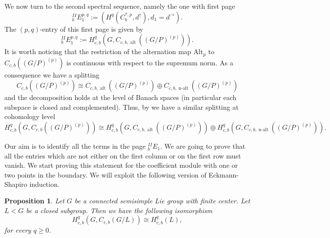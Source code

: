 \documentclass[a4paper]{amsart}
\newtheorem{prop}[lem]{Proposition}
\theoremstyle{definition}
\theoremstyle{remark}
\theoremstyle{TheoremNum}
\DeclareMathOperator{\alt}{\mathrm{alt}}
\DeclareMathOperator{\nalt}{\mathrm{n-alt}}
\begin{document}
We now turn to the second spectral sequence, namely the one with first page
$$
^{II}_bE_1^{p,q}:=(H^q(C_b^{\ast,p},d^\uparrow),d_1=d^\rightarrow). 
$$
The $(p,q)$-entry of this first page is given by
\begin{equation}\label{pq entry bounded}
^{II}_bE_1^{p,q}:=H_{c,b}^q(G,C_{c,b,\alt}((G/P)^{(p)})).
\end{equation}
It is worth noticing that the restriction of the alternation map $\mathrm{Alt}_p$ to $C_{c,b}((G/P)^{(p)})$ is continuous with respect to the supremum norm. As a consequence we have a splitting
\begin{equation}\label{splitting bounded}
C_{c,b}((G/P)^{(p)}) \cong C_{c,b,\alt}((G/P)^{(p)}) \oplus C_{c,b,\nalt}((G/P)^{(p)})
\end{equation}
and the decomposition holds at the level of Banach spaces (in particular each subspace is closed and complemented). Thus, by \cite[Corollary 8.2.10]{Monodbook} we have a similar splitting at cohomology level
\begin{equation}\label{splitting bounded cohomology}
H^q_{c,b}(G,C_{c,b}((G/P)^{(p)})) \cong H^q_{c,b}(G,C_{c,b,\alt}((G/P)^{(p)})) \oplus H^q_{c,b}(G,C_{c,b,\nalt}((G/P)^{(p)})). 
\end{equation}

Our aim is to identify all the terms in the page $^{II}_bE_1$. We are going to prove that all the entries which are not either on the first column or on the first row must vanish. We start proving this statement for the coefficient module with one or two points in the boundary. We will exploit the following version of Eckmann-Shapiro induction.

\begin{prop}\label{continuous induction iso}
Let $G$ be a connected semisimple Lie group with finite center. Let $L < G$ be a closed subgroup. Then we have the following isomorphism
$$
H^q_{c,b}(G,C_{c,b}(G/L)) \cong H^q_{c,b}(L),
$$
for every $q \geq 0$. 
\end{prop}
\end{document}
